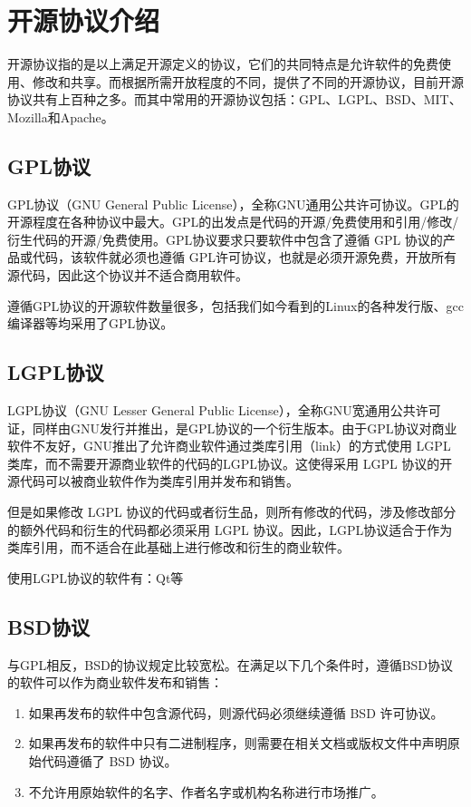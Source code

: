 \documentclass[UTF8]{ctexart}
\begin{document}
\section{开源协议介绍}
开源协议指的是以上满足开源定义的协议，它们的共同特点是允许软件的免费使用、修改和共享。而根据所需开放程度的不同，提供了不同的开源协议，目前开源协议共有上百种之多。而其中常用的开源协议包括：GPL、LGPL、BSD、MIT、Mozilla和Apache。
\subsection{GPL协议}
GPL协议（GNU General Public License），全称GNU通用公共许可协议。GPL的开源程度在各种协议中最大。GPL的出发点是代码的开源/免费使用和引用/修改/衍生代码的开源/免费使用。GPL协议要求只要软件中包含了遵循 GPL 协议的产品或代码，该软件就必须也遵循 GPL许可协议，也就是必须开源免费，开放所有源代码，因此这个协议并不适合商用软件。

遵循GPL协议的开源软件数量很多，包括我们如今看到的Linux的各种发行版、gcc编译器等均采用了GPL协议。
\subsection{LGPL协议}
LGPL协议（GNU Lesser General Public License），全称GNU宽通用公共许可证，同样由GNU发行并推出，是GPL协议的一个衍生版本。由于GPL协议对商业软件不友好，GNU推出了允许商业软件通过类库引用（link）的方式使用 LGPL 类库，而不需要开源商业软件的代码的LGPL协议。这使得采用 LGPL 协议的开源代码可以被商业软件作为类库引用并发布和销售。

但是如果修改 LGPL 协议的代码或者衍生品，则所有修改的代码，涉及修改部分的额外代码和衍生的代码都必须采用 LGPL 协议。因此，LGPL协议适合于作为类库引用，而不适合在此基础上进行修改和衍生的商业软件。

使用LGPL协议的软件有：Qt等
\subsection{BSD协议}
与GPL相反，BSD的协议规定比较宽松。在满足以下几个条件时，遵循BSD协议的软件可以作为商业软件发布和销售：
\begin{enumerate}
    \item 如果再发布的软件中包含源代码，则源代码必须继续遵循 BSD 许可协议。
    \item 如果再发布的软件中只有二进制程序，则需要在相关文档或版权文件中声明原始代码遵循了 BSD 协议。
    \item 不允许用原始软件的名字、作者名字或机构名称进行市场推广。
\end{enumerate}
\end{document}
